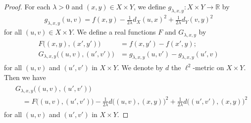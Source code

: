 \documentclass[draft]{amsart}
\numberwithin{equation}{section}
\def\R{\mathbb R}
\theoremstyle{plain}
\theoremstyle{definition}
\theoremstyle{remark}
\begin{document}
\begin{proof}
 For each $\lambda>0$ and $(x,y)\in X\times Y$, 
 we define $g_{\lambda, x,y}\colon X\times Y\to \R$ by 
 \begin{align}
  g_{\lambda, x,y}(u,v)
  = f(x,y) -\frac{1}{2\lambda}d_X(u,x)^2 + \frac{1}{2\lambda}d_Y(v,y)^2
 \end{align}
 for all $(u,v) \in X\times Y$. 
 We define a real functions $F$ and $G_{\lambda,x,y}$ 
 by 
 \begin{align}
  \begin{split}
  F\bigl((x,y),(x',y')\bigr) &= f(x,y')-f(x',y); \\
  G_{\lambda,x,y}\bigl((u,v),(u',v')\bigr) & = g_{\lambda,x,y}(u,v') - 
 g_{\lambda,x,y}(u',v)   
  \end{split}
 \end{align}
 for all $(u,v)$ and $(u',v')$ in $X\times Y$. 
 We denote by $d$ the $\ell^2$-metric on $X\times Y$. Then we have 
 \begin{align}
 \begin{split}
  &G_{\lambda,x,y}\bigl((u,v),(u',v')\bigr) \\
  &\quad = F\bigl((u,v),(u',v')\bigr) 
  -\frac{1}{2\lambda}d\bigl((u,v),(x,y)\bigr)^2 
  + \frac{1}{2\lambda}d\bigl((u',v'), (x,y)\bigr)^2  
 \end{split}
 \end{align}
 for all $(u,v)$ and $(u',v')$ in $X\times Y$. 


\end{proof}
\end{document}
